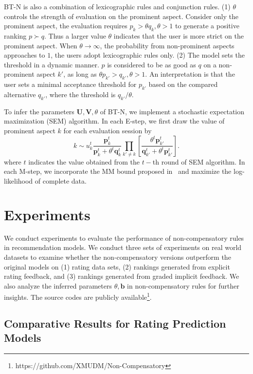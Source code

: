 \documentclass[letterpaper]{article} %
\begin{document}
BT-N is also a combination of lexicographic rules and conjunction rules. (1) $\theta$ controls the strength of evaluation on the prominent aspect. Consider only the prominent aspect, the evaluation requires $p_{k} > \theta q_{k}, \theta>1$ to generate a positive ranking $p\succ q$. Thus a larger value $\theta$ indicates that the user is more strict on the prominent aspect. When $\theta \rightarrow \infty$, the probability from non-prominent aspects  approaches to $1$, the users adopt lexicographic rules only. (2) The model sets the threshold in a dynamic manner. $p$ is considered to be as good as $q$ on a non-prominent aspect $k'$, as long as $\theta p_{k'} >  q_{k'},\theta>1$.  An interpretation is that the user sets a minimal acceptance threshold for $p_{k'}$ based on the compared alternative $q_{k'}$, where the threshold is $q_{k'}/\theta$.  

To infer the parameters $\mathbf{U},\mathbf{V},\theta$ of BT-N, we implement a stochastic expectation maximization (SEM) algorithm. In each E-step, we first draw the value of prominent aspect $k$ for each evaluation session by
 \begin{equation}
 k \sim u_k^{t} \frac{\mathbf{p}_{k}^t} {\mathbf{p}_{k}^t+\theta^t \mathbf{q}_{k}^t} \prod_{k'\neq k}  [\frac{\theta^t \mathbf{p}_{k'}^t} {\mathbf{q}_{k'}^t + \theta^t \mathbf{p}_{k'}^t}].
 \end{equation}
 where $t$ indicates the value obtained from the $t-$th round of SEM algorithm.
 In each M-step, we incorporate the MM bound proposed in~\cite{Hunter2004MM} and maximize the log-likelihood of complete data. 



\section{Experiments}\label{sec:experiment}
We conduct experiments to evaluate the performance of non-compensatory rules in recommendation models. We conduct three sets of experiments on real world datasets to examine whether the non-compensatory versions outperform the original models on (1) rating data sets, (2) rankings generated from explicit rating feedback, and (3) rankings generated from graded implicit feedback. We also analyze the inferred parameters $\theta,\mathbf{b}$ in non-compensatory rules for further insights. The source codes are publicly available\footnote{https://github.com/XMUDM/Non-Compensatory}.

\subsection{Comparative Results for Rating Prediction Models}
\end{document}
